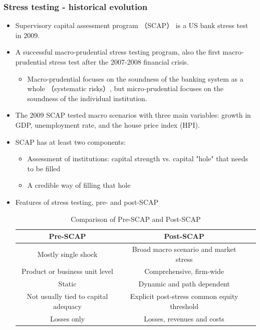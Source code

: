 \subsubsection{Stress testing - historical evolution}
\begin{itemize}
\item Supervisory capital assessment program （SCAP） is a US bank stress test in 2009.
\item A successful macro-prudential stress testing program, also the first macro-prudential stress test after the 2007-2008 financial crisis.
    \begin{itemize}
    \item Macro-prudential focuses on the soundness of the banking system as a whole （systematic risks）, but micro-prudential focuses on the soundness of the individual institution.
    \end{itemize}
\item The 2009 SCAP tested macro scenarios with three main variables: growth in GDP, unemployment rate, and the house price index (HPI).
\item SCAP has at least two components:
    \begin{itemize}
    \item Assessment of institutions: capital strength vs. capital "hole" that needs to be filled
    \item A credible way of filling that hole
    \end{itemize}
\item Features of stress testing, pre- and post-SCAP
\begin{table}[h]
    \centering
    \caption{Comparison of Pre-SCAP and Post-SCAP}
    \renewcommand{\arraystretch}{1.5} %
    \begin{tabular}{|c|c|c|}
        \hline
        \textbf{Pre-SCAP} & \textbf{Post-SCAP} \\
        \hline
        Mostly single shock & Broad macro scenario and market stress \\
        \hline
        Product or business unit level & Comprehensive, firm-wide \\
        \hline
        Static & Dynamic and path dependent \\
        \hline
        Not usually tied to capital adequacy & Explicit post-stress common equity threshold \\
        \hline
        Losses only & Losses, revenues and costs \\
        \hline
    \end{tabular}

\end{table}
\end{itemize}
